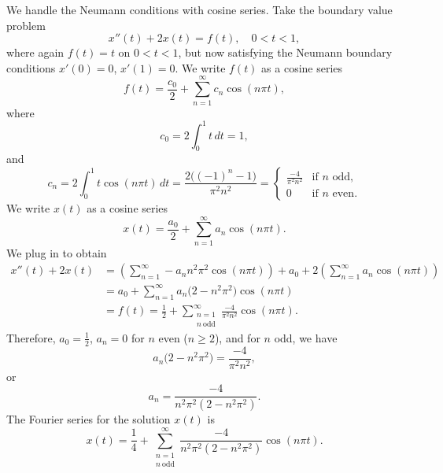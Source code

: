 \begin{example}
We handle the Neumann conditions with cosine series.
Take the boundary value problem
\begin{equation*}
x''(t) + 2 x(t) = f(t) , \quad 0 < t < 1,
\end{equation*}
where again $f(t) = t$ on $0 < t < 1$, but now satisfying
the Neumann boundary conditions
$x'(0) = 0$, $x'(1)=0$.
We write $f(t)$ as a cosine series
\begin{equation*}
f(t) = \frac{c_0}{2} + \sum_{n=1}^\infty c_n \cos (n \pi t) ,
\end{equation*}
where
\begin{equation*}
c_0 = 2 \int_0^1 t \,dt = 1 ,
\end{equation*}
and
\begin{equation*}
c_n = 2 \int_0^1 t \cos (n \pi t) \,dt =
\frac{2\bigl({(-1)}^n-1\bigr)}{\pi^2 n^2} = 
\begin{cases}
\frac{-4}{\pi^2 n^2} & \text{if } n \text{ odd} , \\
0 & \text{if } n \text{ even}.
\end{cases}
\end{equation*}
We write $x(t)$ as a cosine series
\begin{equation*}
x(t) = \frac{a_0}{2} + \sum_{n=1}^\infty a_n \cos (n \pi t) .
\end{equation*}
We plug in to obtain 
\begin{equation*}
\begin{split}
x''(t) + 2 x(t) & =
\left(
\sum_{n=1}^\infty - a_n n^2 \pi^2 \cos (n \pi t)
\right)
+
a_0 +
2
\left(
\sum_{n=1}^\infty a_n \cos (n \pi t)
\right)
\\
& =
a_0 +
\sum_{n=1}^\infty a_n \bigl(2 - n^2 \pi^2 \bigr) \cos (n \pi t)
\\
& = f(t)
=
\frac{1}{2} +
\sum_{\substack{n=1\\n~\text{odd}}}^\infty
\frac{-4}{\pi^2 n^2} \cos (n \pi t) .
\end{split}
\end{equation*}
Therefore,
$a_0 = \frac{1}{2}$,
$a_n = 0$ for $n$ even ($n \geq 2$), and for
$n$ odd, we have
\begin{equation*}
a_n \bigl(2 - n^2 \pi^2\bigr)
=
\frac{-4}{\pi^2 n^2} ,
\end{equation*}
or
\begin{equation*}
a_n
=
\frac{-4}{n^2 \pi^2 (2 - n^2 \pi^2)} .
\end{equation*}
The Fourier series for the solution $x(t)$ is
\begin{equation*}
x(t) = 
\frac{1}{4} +
\sum_{\substack{n=1\\n~\text{odd}}}^\infty
\frac{-4}{n^2 \pi^2 (2 - n^2 \pi^2)} 
\cos (n \pi t) .
\end{equation*}
\end{example}

